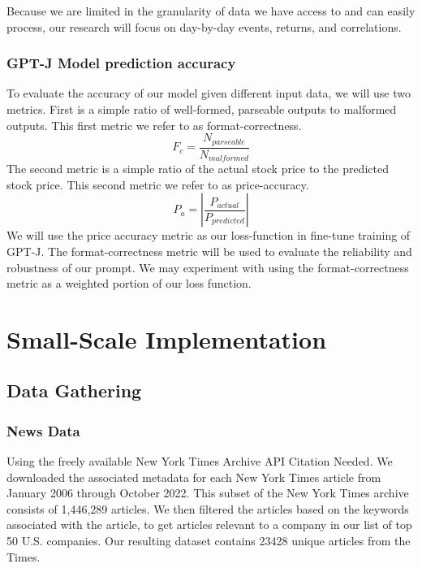 \documentclass[conference]{IEEEtran}
\begin{document}
Because we are limited in the granularity of data we have access to and can easily process, our research will focus on day-by-day events, returns, and correlations.

\subsubsection{GPT-J Model prediction accuracy}
To evaluate the accuracy of our model given different input data, we will use two metrics. First is a simple ratio of well-formed, parseable outputs to malformed outputs. This first metric we refer to as format-correctness. 
\begin{equation}
	F_c=\frac{N_{parseable}}{N_{malformed}}
\end{equation}
The second metric is a simple ratio of the actual stock price to the predicted stock price. This second metric we refer to as price-accuracy.
\begin{equation}
	P_a=\left|\frac{P_{actual}}{P_{predicted}}\right|
\end{equation}
We will use the price accuracy metric as our loss-function in fine-tune training of GPT-J. The format-correctness metric will be used to evaluate the reliability and robustness of our prompt. We may experiment with using the format-correctness metric as a weighted portion of our loss function.
\section{Small-Scale Implementation}
\subsection{Data Gathering} 
\subsubsection{News Data}
Using the freely available New York Times Archive API {Citation Needed}. We downloaded the associated metadata for each New York Times article from January 2006 through October 2022. This subset of the New York Times archive consists of 1,446,289 articles. We then filtered the articles based on the keywords associated with the article, to get articles relevant to a company in our list of top 50 U.S. companies. Our resulting dataset contains 23428 unique articles from the Times. 
\end{document}
